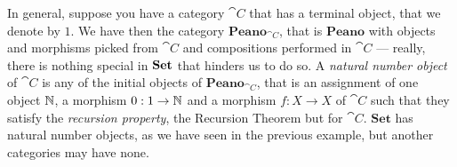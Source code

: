 \begin{remark}
In general, suppose you have a category \(\cat C\) that has a terminal object, that we denote by \(1\).  We have then the category \(\mathbf{Peano}_{\cat C}\), that is \(\mathbf{Peano}\) with objects and morphisms picked from \(\cat C\) and compositions performed in \(\cat C\) --- really, there is nothing special in \(\mathbf{Set}\) that hinders us to do so. A {\em natural number object} of \(\cat C\) is any of the initial objects of \(\mathbf{Peano}_{\cat C}\), that is an assignment of one object \(\mathbb N\), a morphism \(0 : 1 \to \mathbb N\) and a morphism \(f : X \to X\) of \(\cat C\) such that they satisfy the {\em recursion property}, the Recursion Theorem but for \(\cat C\). \(\mathbf{Set}\) has natural number objects, as we have seen in the previous example, but another categories may have none.  
\end{remark}

